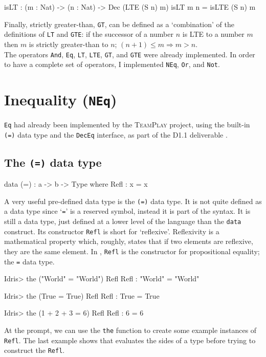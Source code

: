         \begin{code}[caption={\texttt{GT} can be defined based on \texttt{LTE}}]
        isLT : (m : Nat) -> (n : Nat) -> Dec (LTE (S n) m)
        isLT m n = isLTE (S n) m
        \end{code}
        
        Finally, strictly greater-than, \texttt{GT}, can be defined as a `combination' of the definitions of \texttt{LT} and \texttt{GTE}: if the successor of a number $n$ is LTE to a number $m$ then $m$ is strictly greater-than to $n$; $(n + 1) \leq m \Rightarrow m > n$.
        \\
        
        The operators \texttt{And}, \texttt{Eq}, \texttt{LT}, \texttt{LTE}, \texttt{GT}, and \texttt{GTE} were already implemented. In order to have a complete set of operators, I implemented \texttt{NEq}, \texttt{Or}, and \texttt{Not}.


\section{Inequality (\texttt{NEq})}\label{des:neq}
    \texttt{Eq} had already been implemented by the \textsc{TeamPlay} project, using the built-in \texttt{(=)} data type and the \texttt{DecEq} interface, as part of the D1.1 deliverable \cite{teamplay:d1.1}.
    
    \subsection{The \texttt{(=)} data type}
        \begin{code}[label={des:refl-concept}, caption={The concept of an equality data type}]
        data (=) : a -> b -> Type where
            Refl : x = x
        \end{code}
    
        A very useful pre-defined data type is the \texttt{(=)} data type. It is not quite defined as a data type since `\texttt{=}' is a reserved symbol, instead it is part of the \Idris syntax. It is still a data type, just defined at a lower level of the language than the \texttt{data} construct. Its constructor \texttt{Refl} is short for `reflexive'. Reflexivity is a mathematical property which, roughly, states that if two elements are reflexive, they are the same element. In \Idris, \texttt{Refl} is the constructor for propositional equality; the \texttt{=} data type.
    
        \begin{code}[label={des:refl-egs}, caption={Examples of reflexivity}]
        Idris> the ("World" = "World") Refl
        Refl : "World" = "World"
        
        
        Idris> the (True = True) Refl
        Refl : True = True
        
        
        Idris> the (1 + 2 + 3 = 6) Refl
        Refl : 6 = 6
        \end{code}
        At the \Idris prompt, we can use the \texttt{the} function to create some example instances of \texttt{Refl}. The last example shows that \Idris evaluates the sides of a type before trying to construct the \texttt{Refl}.
    
